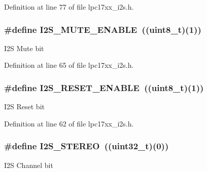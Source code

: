 \-Definition at line 77 of file lpc17xx\-\_\-i2s.\-h.

\hypertarget{group___i2_s___public___macros_ga3f418f8bc5e6f401481d3b9e241758bb}{
\subsubsection[{\-I2\-S\-\_\-\-M\-U\-T\-E\-\_\-\-E\-N\-A\-B\-L\-E}]{\setlength{\rightskip}{0pt plus 5cm}\#define {\bf \-I2\-S\-\_\-\-M\-U\-T\-E\-\_\-\-E\-N\-A\-B\-L\-E}~((uint8\-\_\-t)(1))}}\label{group___i2_s___public___macros_ga3f418f8bc5e6f401481d3b9e241758bb}
\-I2\-S \-Mute bit 

\-Definition at line 65 of file lpc17xx\-\_\-i2s.\-h.

\hypertarget{group___i2_s___public___macros_gae090c11fade3a6f9bf9791dba1920556}{
\subsubsection[{\-I2\-S\-\_\-\-R\-E\-S\-E\-T\-\_\-\-E\-N\-A\-B\-L\-E}]{\setlength{\rightskip}{0pt plus 5cm}\#define {\bf \-I2\-S\-\_\-\-R\-E\-S\-E\-T\-\_\-\-E\-N\-A\-B\-L\-E}~((uint8\-\_\-t)(1))}}\label{group___i2_s___public___macros_gae090c11fade3a6f9bf9791dba1920556}
\-I2\-S \-Reset bit 

\-Definition at line 62 of file lpc17xx\-\_\-i2s.\-h.

\hypertarget{group___i2_s___public___macros_ga07e34ebc83183644aa54cc124b769a43}{
\subsubsection[{\-I2\-S\-\_\-\-S\-T\-E\-R\-E\-O}]{\setlength{\rightskip}{0pt plus 5cm}\#define {\bf \-I2\-S\-\_\-\-S\-T\-E\-R\-E\-O}~((uint32\-\_\-t)(0))}}\label{group___i2_s___public___macros_ga07e34ebc83183644aa54cc124b769a43}
\-I2\-S \-Channel bit 

